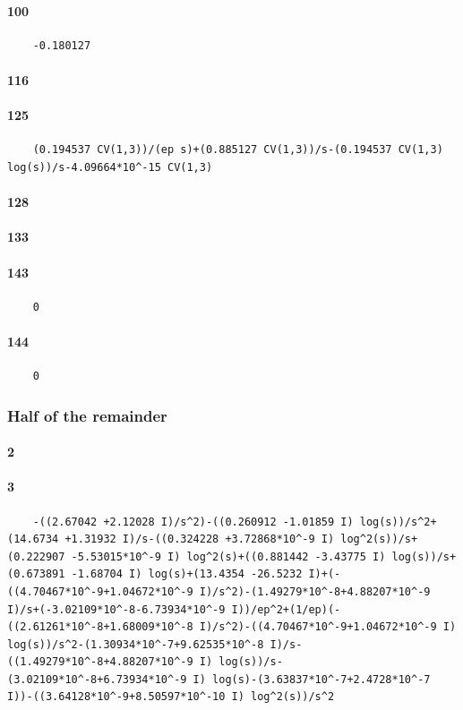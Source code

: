 \documentclass{article}
\begin{document}
\paragraph{100}
\begin{verbatim}
	-0.180127
\end{verbatim}
\paragraph{116}
\paragraph{125}
\begin{verbatim}
	(0.194537 CV(1,3))/(ep s)+(0.885127 CV(1,3))/s-(0.194537 CV(1,3) log(s))/s-4.09664*10^-15 CV(1,3)
\end{verbatim}
\paragraph{128}
\paragraph{133}
\paragraph{143}
\begin{verbatim}
	0
\end{verbatim}
\paragraph{144}
\begin{verbatim}
	0
\end{verbatim}
\subsubsection{Half of the remainder}
\paragraph{2}
\paragraph{3}
\begin{verbatim}
	-((2.67042 +2.12028 I)/s^2)-((0.260912 -1.01859 I) log(s))/s^2+(14.6734 +1.31932 I)/s-((0.324228 +3.72868*10^-9 I) log^2(s))/s+(0.222907 -5.53015*10^-9 I) log^2(s)+((0.881442 -3.43775 I) log(s))/s+(0.673891 -1.68704 I) log(s)+(13.4354 -26.5232 I)+(-((4.70467*10^-9+1.04672*10^-9 I)/s^2)-(1.49279*10^-8+4.88207*10^-9 I)/s+(-3.02109*10^-8-6.73934*10^-9 I))/ep^2+(1/ep)(-((2.61261*10^-8+1.68009*10^-8 I)/s^2)-((4.70467*10^-9+1.04672*10^-9 I) log(s))/s^2-(1.30934*10^-7+9.62535*10^-8 I)/s-((1.49279*10^-8+4.88207*10^-9 I) log(s))/s-(3.02109*10^-8+6.73934*10^-9 I) log(s)-(3.63837*10^-7+2.4728*10^-7 I))-((3.64128*10^-9+8.50597*10^-10 I) log^2(s))/s^2
\end{verbatim}
\end{document}
